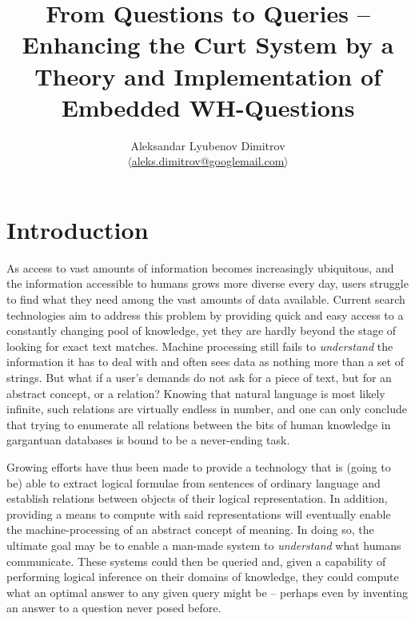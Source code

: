 \documentclass[notitlepage,twoside,a4paper]{scrreprt}
\author{Aleksandar Lyubenov Dimitrov\\
$\langle$\href{mailto:aleks.dimitrov@googlemail.com}{aleks.dimitrov@googlemail.com}$\rangle$}
\title{From Questions to Queries – Enhancing the Curt System by a Theory and Implementation of Embedded WH-Questions}
\theoremstyle{remark}
\theoremstyle{remark}
\theoremstyle{definition}
\theoremstyle{definition}
\begin{document}
\lstset{language=Prolog,numbers=left,numberstyle=\tiny,numbersep=5pt,stepnumber=2,basicstyle=\ttfamily,identifierstyle=\textbf,keywordstyle=\underbar}
\renewcommand{\thepage}{\roman{page}}
\mbox{}
\newpage
\tableofcontents
\newpage
{}
\thispagestyle{plain}
\newpage
\renewcommand{\thepage}{\arabic{page}}
\setcounter{page}{1}
\chapter{Introduction}

As access to vast amounts of information becomes increasingly ubiquitous, and
the information accessible to humans grows more diverse every day, users
struggle to find what they need among the vast amounts of data available.
Current search technologies aim to address this problem by providing quick and
easy access to a constantly changing pool of knowledge, yet they are hardly
beyond the stage of looking for exact text matches. Machine processing still
fails to \emph{understand} the information it has to deal with and often sees data as
nothing more than a set of strings. But what if a user's demands do not ask for a
piece of text, but for an abstract concept, or a relation? Knowing that natural
language is most likely infinite, such relations are virtually endless in
number, and  one can only conclude that trying to enumerate all relations
between the bits of  human knowledge in gargantuan databases is bound to be a
never-ending task.

Growing efforts have thus been made to provide a technology that is (going to
be) able to extract logical formulae from sentences of ordinary language and
establish relations between objects of their logical representation. In
addition, providing a means to compute with said representations will eventually
enable the machine-processing of an abstract concept of meaning. In doing so,
the ultimate goal may be to enable a man-made system to \emph{understand} what
humans communicate.  These systems could then be queried and, given a capability
of performing logical inference on their domains of knowledge, they could
compute what an optimal answer to any given query might be -- perhaps even
by inventing an answer to a question never posed before.
\end{document}
